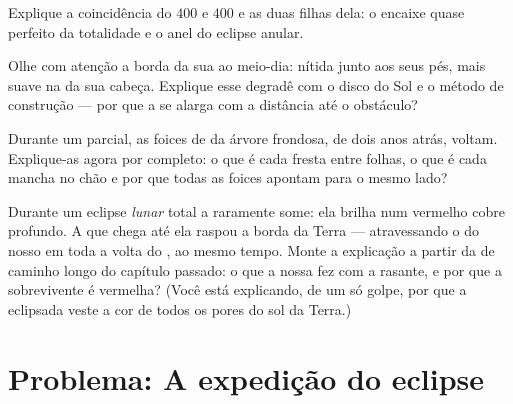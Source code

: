 \begin{exercise}[$\star\star$]\label{exo:g7:shadows-eclipses:9}
Explique a coincidência do $400$ e $400$ e as duas filhas dela: o
encaixe quase perfeito da totalidade e o anel do eclipse anular.
\end{exercise}

\begin{exercise}[$\star\star$]\label{exo:g7:shadows-eclipses:10}
Olhe com atenção a borda da sua  ao meio-dia: nítida junto aos
seus pés, mais suave na  da sua cabeça. Explique esse degradê
com o disco do Sol e o método de construção --- por que a  se
alarga com a distância até o obstáculo?
\end{exercise}

\begin{exercise}[$\star\star$]\label{exo:g7:shadows-eclipses:11}
Durante um  parcial, as foices de  da árvore
frondosa, de dois anos atrás, voltam. Explique-as agora por
completo: o que é cada fresta entre folhas, o que é cada mancha no
chão e por que todas as foices apontam para o mesmo lado?
\end{exercise}

\begin{exercise}[$\star\star\star$]\label{exo:g7:shadows-eclipses:12}
Durante um eclipse \emph{lunar} total a  raramente some: ela
brilha num vermelho cobre profundo. A  que chega até ela raspou a
borda da Terra --- atravessando o  do nosso  em toda a
volta do , ao mesmo tempo. Monte a explicação a partir da
 de caminho longo do capítulo passado: o que a nossa 
fez com a  rasante, e por que a  sobrevivente é vermelha? (Você
está explicando, de um só golpe, por que a  eclipsada veste a cor
de todos os pores do sol da Terra.)
\end{exercise}

\section{Problema: A expedição do eclipse}

